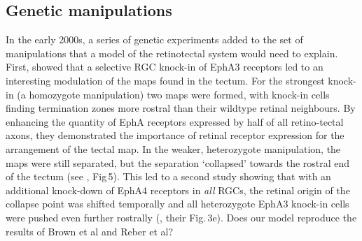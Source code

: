 \documentclass[11pt, a4paper]{article}
\begin{document}
\subsection*{Genetic manipulations}

In the early 2000s, a series of genetic experiments added to the set of manipulations that a model of the retinotectal system would need to
explain.
First, \citet{brown_topographic_2000} showed that a selective RGC knock-in of EphA3 receptors led to an interesting modulation of the maps found in the tectum.
For the strongest knock-in (a homozygote manipulation) two maps were formed, with knock-in cells finding termination zones more rostral than their wildtype retinal neighbours.
By enhancing the quantity of EphA receptors expressed by half of all retino-tectal axons, they demonstrated the importance of retinal receptor expression for the arrangement of the tectal map.
In the weaker, heterozygote manipulation, the maps were still separated, but the separation `collapsed' towards the rostral end of the tectum (see \citet{brown_topographic_2000}, Fig\,5).
This led to a second study showing that with an additional knock-down of EphA4 receptors in \emph{all} RGCs, the retinal origin of the collapse point was shifted temporally and all heterozygote EphA3 knock-in cells were pushed even further rostrally (\citet{reber_relative_2004}, their Fig.\,3e).
Does our model reproduce the results of Brown et al and Reber et al?
\end{document}
